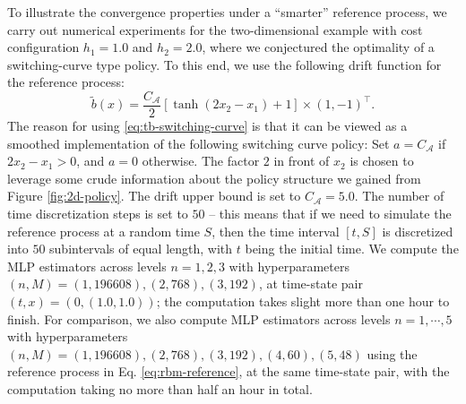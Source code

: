 \documentclass[11pt]{article}
\theoremstyle{definition}
\theoremstyle{plain}
\newcommand{\tb}{\tilde{b}}
\begin{document}
To illustrate the convergence properties under a ``smarter'' reference process, 
we carry out numerical experiments for the two-dimensional example with cost configuration $h_1 = 1.0$ and $h_2 = 2.0$, 
where we conjectured the optimality of a switching-curve type policy. 
To this end, 
we use the following drift function for the reference process: 
\begin{equation}\label{eq:tb-switching-curve}
  \tb(x) = \frac{C_{\mathcal{A}}}{2}\left[\tanh(2x_2 - x_1) + 1\right] \times (1, -1)^{\top}. 
\end{equation}
The reason for using \eqref{eq:tb-switching-curve} is that it can be viewed as a smoothed implementation of the following switching curve policy: 
Set $a = C_{\mathcal{A}}$ if $2x_2 - x_1 > 0$, and $a = 0$ otherwise. The factor $2$ in front of $x_2$ is chosen to 
leverage some crude information about the policy structure we gained from Figure \ref{fig:2d-policy}.
The drift upper bound is set to $C_{\mathcal{A}}=5.0$. 
The number of time discretization steps is set to $50$ -- this means that if we need to simulate the reference process at a random time $S$, 
then the time interval $[t, S]$ is discretized into $50$ subintervals of equal length, with $t$ being the initial time. We compute the MLP estimators across levels $n=1,2,3$ with 
hyperparameters $(n,M) = (1,196608), (2,768), (3,192)$, at time-state pair $(t,x) = (0, (1.0, 1.0))$; the computation takes slight more than one hour to finish.
For comparison, we also compute MLP estimators across levels $n=1, \cdots, 5$ with 
hyperparameters $(n,M) = (1,196608), (2,768), (3,192), (4, 60), (5,48)$ using the reference process in Eq. \eqref{eq:rbm-reference}, at the same time-state pair, 
with the computation taking no more than half an hour in total. 
\end{document}
